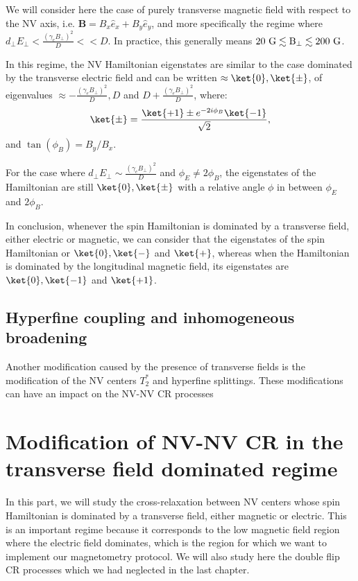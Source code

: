\documentclass[a4paper,11pt]{report}
\begin{document}

We will consider here the case of purely transverse magnetic field with respect to the NV axis, i.e. $\mathbf{B}=B_x \hat{e}_x + B_y \hat e_y$, and more specifically the regime where $d_\perp E_\perp < \frac{(\gamma_e B_\perp)^2}{D} << D$. In practice, this generally means $20\ \rm G \lesssim B_\perp \lesssim 200\ \rm G$.

In this regime, the NV Hamiltonian eigenstates are similar to the case dominated by the transverse electric field and can be written $\approx \ket{0}, \ket{\pm}$\citep{qiu2021nuclear, qiu2022nanoscale}, of eigenvalues $\approx -\frac{(\gamma_e B_\perp)^2}{D},D$ and $D+\frac{(\gamma_e B_\perp)^2}{D}$,  where:
\begin{equation}
\ket{\pm}=\frac{\ket{+1}\pm e^{-2i\phi_B}\ket{-1}}{\sqrt{2}},
\end{equation}
and $\tan(\phi_B)=B_y/B_x$.

For the case where $d_\perp E_\perp \sim \frac{(\gamma_e B_\perp)^2}{D}$ and $\phi_E \neq 2\phi_B$, the eigenstates of the Hamiltonian are still $\ket{0},\ket{\pm}$ with a relative angle $\phi$ in between $\phi_E$ and $2\phi_B$.

In conclusion, whenever the spin Hamiltonian is dominated by a transverse field, either electric or magnetic, we can consider that the eigenstates of the spin Hamiltonian or $\ket{0}, \ket{-}$ and $\ket{+}$, whereas when the Hamiltonian is dominated by the longitudinal magnetic field, its eigenstates are $\ket{0}, \ket{-1}$ and $\ket{+1}$.

\subsection{Hyperfine coupling and inhomogeneous broadening}

Another modification caused by the presence of transverse fields is the modification of the NV centers $T_2^*$ and hyperfine splittings. These modifications can have an impact on the NV-NV CR processes 


\section{Modification of NV-NV CR in the transverse field dominated regime}
In this part, we will study the cross-relaxation between NV centers whose spin Hamiltonian is dominated by a transverse field, either magnetic or electric. This is an important regime because it corresponds to the low magnetic field region where the electric field dominates, which is the region for which we want to implement our magnetometry protocol. We will also study here the double flip CR processes which we had neglected in the last chapter.
\end{document}

